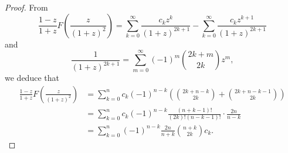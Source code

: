 \documentclass[10pt,a4paper]{amsart}
\begin{document}
\begin{proof}
From
\[\frac{1-z}{1+z}F\left (\frac{z}{(1+z)^2}\right )=\sum_{k=0}^{\infty}\frac{c_k z^k}{(1+z)^{2k+1}}-\sum_{k=0}^{\infty}\frac{c_k z^{k+1}}{(1+z)^{2k+1}}\]
and 
\[\frac{1}{(1+z)^{2k+1}} = \sum_{m=0}^{\infty} (-1)^m \binom{2k+m}{2k} z^m,\]
we deduce that
\begin{align*}
[z^n] \frac{1-z}{1+z}F\left (\frac{z}{(1+z)^2}\right ) &= \sum_{k=0}^n c_k(-1)^{n-k} \left(\binom{2k+n-k}{2k}+\binom{2k+n-k-1}{2k} \right) \\
&= \sum_{k=0}^n c_k (-1)^{n-k} \frac{(n+k-1)!}{(2k)!(n-k-1)!}\cdot\frac{2n}{n-k} \\
&= \sum_{k=0}^n (-1)^{n-k} \frac{2n}{n+k} \binom{n+k}{2k} c_k. 
\end{align*}
\end{proof}
\end{document}

